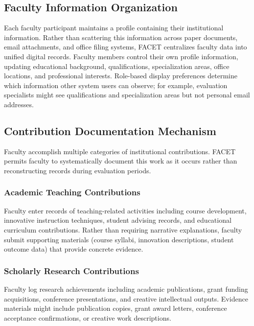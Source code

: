 \documentclass[conference]{IEEEtran}
\begin{document}
\subsection{Faculty Information Organization}
\label{subsec:faculty}

Each faculty participant maintains a profile containing their institutional information. Rather than scattering this information across paper documents, email attachments, and office filing systems, FACET centralizes faculty data into unified digital records. Faculty members control their own profile information, updating educational background, qualifications, specialization areas, office locations, and professional interests. Role-based display preferences determine which information other system users can observe; for example, evaluation specialists might see qualifications and specialization areas but not personal email addresses.

\subsection{Contribution Documentation Mechanism}
\label{subsec:contributions}

Faculty accomplish multiple categories of institutional contributions. FACET permits faculty to systematically document this work as it occurs rather than reconstructing records during evaluation periods.

\subsubsection{Academic Teaching Contributions}
Faculty enter records of teaching-related activities including course development, innovative instruction techniques, student advising records, and educational curriculum contributions. Rather than requiring narrative explanations, faculty submit supporting materials (course syllabi, innovation descriptions, student outcome data) that provide concrete evidence.

\subsubsection{Scholarly Research Contributions}
Faculty log research achievements including academic publications, grant funding acquisitions, conference presentations, and creative intellectual outputs. Evidence materials might include publication copies, grant award letters, conference acceptance confirmations, or creative work descriptions.
\end{document}
